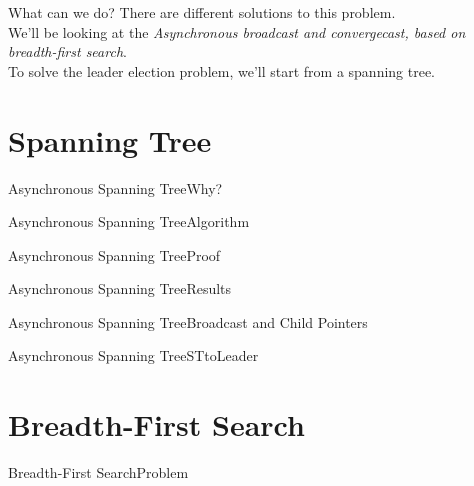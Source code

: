 \documentclass[pdf]{beamer}
\begin{document}
\begin{frame}{What can we do?}
    There are different solutions to this problem.\\
    \vspace{12pt}
    We'll be looking at the \emph{Asynchronous broadcast and convergecast, based on breadth-first search}.\\
    \vspace{12pt}
    To solve the leader election problem, we'll start from a spanning tree.
\end{frame}

\section{Spanning Tree}
\begin{frame}{Asynchronous Spanning Tree}{Why?}
	
\end{frame}

\begin{frame}{Asynchronous Spanning Tree}{Algorithm}

\end{frame}

\begin{frame}{Asynchronous Spanning Tree}{Proof}
	
	
\end{frame}
\begin{frame}{Asynchronous Spanning Tree}{Results}
	
	
\end{frame}

\begin{frame}{Asynchronous Spanning Tree}{Broadcast and Child Pointers}
	
	
\end{frame}

\begin{frame}{Asynchronous Spanning Tree}{STtoLeader}
	
	
\end{frame}

\section{Breadth-First Search}
\begin{frame}{Breadth-First Search}{Problem}
	
	
\end{frame}
\end{document}
